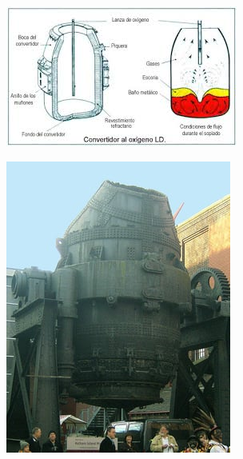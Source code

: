 \documentclass[12pt,a4paper]{article}
\begin{document}
\begin{figure}[h!]
\begin{subfigure}{0.45\textwidth}
        \includegraphics[width=\textwidth]{Inagenes para latex/bof1.png}
        \label{LD}
    \end{subfigure}
    \hfill
    \begin{subfigure}{0.45\textwidth}
        \centering
        \includegraphics[width=\textwidth]{Inagenes para latex/convertidor tamas.png}
        \label{thomas}


\end{subfigure}
\end{figure}
\end{document}

